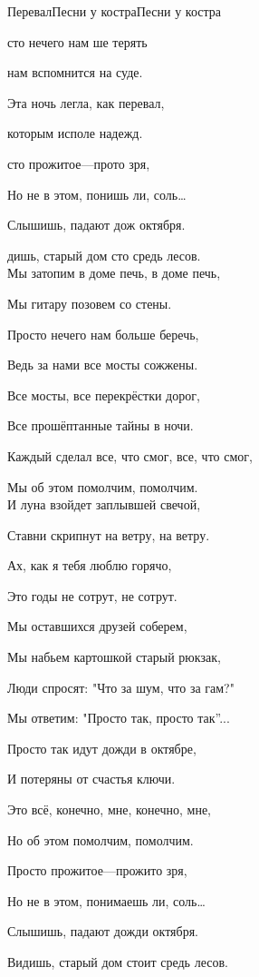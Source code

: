 \documentclass[11pt,a5paper]{book}
\begin{document}
\begin{song}{Перевал}{}{Песни у костра}{Песни у костра}{}{}


сто нечего нам ше терять\par
{} нам вспомнится на  суде.\par
Эта ночь легла, как  перевал,\par
{} которым исполе надежд.\par
{}сто прожитое—прото зря, \par
Но не в этом, понишь ли, соль… \par
Слышишь, падают дож октября.\par
{}дишь, старый дом сто средь лесов.\\

Мы затопим в доме печь, в доме печь,\par
Мы гитару позовем со стены.\par
Просто нечего нам больше беречь,\par
Ведь за нами все мосты сожжены.\par
Все мосты, все перекрёстки дорог,\par
Все прошёптанные тайны в ночи.\par
Каждый сделал все, что смог, все, что смог,\par
Мы об этом помолчим, помолчим.\\


И луна взойдет заплывшей свечой,\par
Ставни скрипнут  на ветру, на ветру.\par
Ах, как я тебя люблю горячо,\par
Это годы не сотрут, не сотрут.\par
Мы оставшихся друзей соберем,\par
Мы набьем картошкой старый рюкзак,\par
Люди спросят: "Что за шум, что за гам?"\par
Мы ответим: "Просто так,  просто так”...\\

\newpage

    Просто так идут дожди в октябре,\par
    И потеряны от счастья ключи.\par
    Это всё, конечно, мне, конечно, мне,\par
    Но об этом помолчим, помолчим.\par
    Просто прожитое—прожито зря,\par
    Но не в этом, понимаешь ли, соль…\par
    Слышишь, падают дожди октября.\par
    Видишь, старый дом стоит средь лесов.\par



\end{song}
\end{document}
